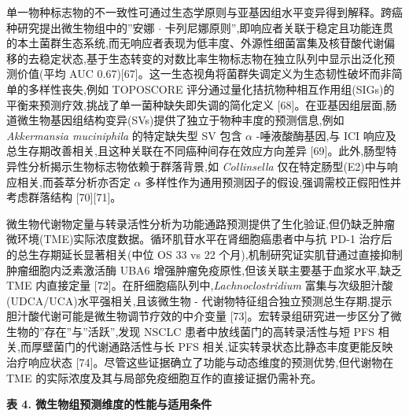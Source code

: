 \documentclass[11pt]{article}
\begin{document}
单一物种标志物的不一致性可通过生态学原则与亚基因组水平变异得到解释。跨癌种研究提出微生物组中的''安娜 \(\cdot\) 卡列尼娜原则'',即响应者关联于稳定且功能连贯的本土菌群生态系统,而无响应者表现为低丰度、外源性细菌富集及核苷酸代谢偏移的去稳定状态,基于生态转变的对数比率生物标志物在独立队列中显示出泛化预测价值(平均 AUC 0.67){[}67{]}。这一生态视角将菌群失调定义为生态韧性破坏而非简单的多样性丧失,例如 TOPOSCORE 评分通过量化拮抗物种相互作用组(SIGs)的平衡来预测疗效,挑战了单一菌种缺失即失调的简化定义 {[}68{]}。在亚基因组层面,肠道微生物基因组结构变异(SVs)提供了独立于物种丰度的预测信息,例如 \emph{Akkermansia muciniphila} 的特定缺失型 SV 包含 \(\alpha\) -唾液酸酶基因,与 ICI 响应及总生存期改善相关,且这种关联在不同癌种间存在效应方向差异 {[}69{]}。此外,肠型特异性分析揭示生物标志物依赖于群落背景,如 \emph{Collinsella} 仅在特定肠型(E2)中与响应相关,而荟萃分析亦否定 \(\alpha\) 多样性作为通用预测因子的假设,强调需校正假阳性并考虑群落结构 {[}70{]}{[}71{]}。

微生物代谢物定量与转录活性分析为功能通路预测提供了生化验证,但仍缺乏肿瘤微环境(TME)实际浓度数据。循环肌苷水平在肾细胞癌患者中与抗 PD-1 治疗后的总生存期延长显著相关(中位 OS 33 vs 22 个月),机制研究证实肌苷通过直接抑制肿瘤细胞内泛素激活酶 UBA6 增强肿瘤免疫原性,但该关联主要基于血浆水平,缺乏 TME 内直接定量 {[}72{]}。在肝细胞癌队列中,\emph{Lachnoclostridium} 富集与次级胆汁酸(UDCA/UCA)水平强相关,且该微生物 - 代谢物特征组合独立预测总生存期,提示胆汁酸代谢可能是微生物调节疗效的中介变量 {[}73{]}。宏转录组研究进一步区分了微生物的''存在''与''活跃'',发现 NSCLC 患者中放线菌门的高转录活性与短 PFS 相关,而厚壁菌门的代谢通路活性与长 PFS 相关,证实转录状态比静态丰度更能反映治疗响应状态 {[}74{]}。尽管这些证据确立了功能与动态维度的预测优势,但代谢物在 TME 的实际浓度及其与局部免疫细胞互作的直接证据仍需补充。

\textbf{表 4. 微生物组预测维度的性能与适用条件}
\end{document}
